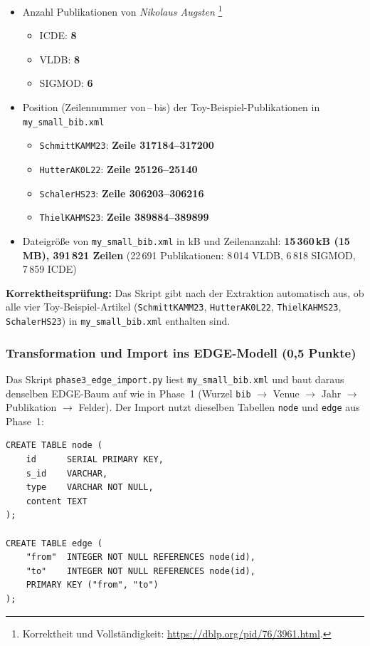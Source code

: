 \documentclass[11pt]{scrartcl}
\begin{document}
\begin{itemize}
  \item Anzahl Publikationen von \textit{Nikolaus Augsten}%
    \footnote{Korrektheit und Vollständigkeit: \url{https://dblp.org/pid/76/3961.html}.}
    \begin{itemize}
      \item ICDE:   \textbf{8}
      \item VLDB:   \textbf{8}
      \item SIGMOD: \textbf{6}
    \end{itemize}
  \item Position (Zeilennummer von\,--\,bis) der Toy-Beispiel-Publikationen in \texttt{my\_small\_bib.xml}
    \begin{itemize}
      \item \texttt{SchmittKAMM23}: \textbf{Zeile 317184--317200}
      \item \texttt{HutterAK0L22}:  \textbf{Zeile 25126--25140}
      \item \texttt{SchalerHS23}:   \textbf{Zeile 306203--306216}
      \item \texttt{ThielKAHMS23}:  \textbf{Zeile 389884--389899}
    \end{itemize}
  \item Dateigröße von \texttt{my\_small\_bib.xml} in kB und Zeilenanzahl:
        \textbf{15\,360\,kB (15\,MB), 391\,821 Zeilen} (22\,691 Publikationen: 8\,014 VLDB, 6\,818 SIGMOD, 7\,859 ICDE)
\end{itemize}

\textbf{Korrektheitsprüfung:} Das Skript gibt nach der Extraktion automatisch aus, ob alle vier
Toy-Beispiel-Artikel (\texttt{SchmittKAMM23}, \texttt{HutterAK0L22}, \texttt{ThielKAHMS23},
\texttt{SchalerHS23}) in \texttt{my\_small\_bib.xml} enthalten sind.

\subsubsection*{Transformation und Import ins EDGE-Modell (0,5 Punkte)}

Das Skript \texttt{phase3\_edge\_import.py} liest \texttt{my\_small\_bib.xml} und baut
daraus denselben EDGE-Baum auf wie in Phase~1 (Wurzel \texttt{bib} $\to$ Venue $\to$
Jahr $\to$ Publikation $\to$ Felder). Der Import nutzt dieselben Tabellen \texttt{node}
und \texttt{edge} aus Phase~1:

\begin{lstlisting}[style=dmrsql, frame=single]
CREATE TABLE node (
    id      SERIAL PRIMARY KEY,
    s_id    VARCHAR,
    type    VARCHAR NOT NULL,
    content TEXT
);

CREATE TABLE edge (
    "from"  INTEGER NOT NULL REFERENCES node(id),
    "to"    INTEGER NOT NULL REFERENCES node(id),
    PRIMARY KEY ("from", "to")
);
\end{lstlisting}
\end{document}
